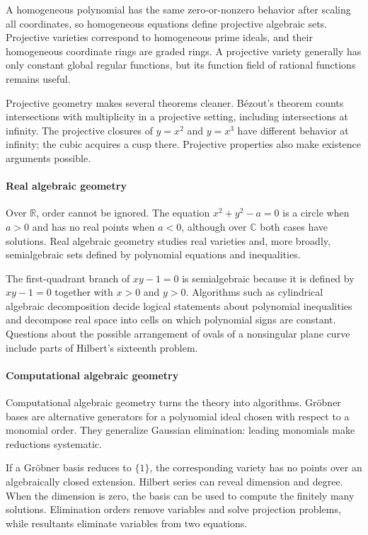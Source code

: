 A homogeneous polynomial has the same zero-or-nonzero behavior after scaling all coordinates, so homogeneous equations define projective algebraic sets. Projective varieties correspond to homogeneous prime ideals, and their homogeneous coordinate rings are graded rings. A projective variety generally has only constant global regular functions, but its function field of rational functions remains useful.

Projective geometry makes several theorems cleaner. Bézout's theorem counts intersections with multiplicity in a projective setting, including intersections at infinity. The projective closures of $y=x^2$ and $y=x^3$ have different behavior at infinity; the cubic acquires a cusp there. Projective properties also make existence arguments possible.

\paragraph{Real algebraic geometry}

Over $\mathbb R$, order cannot be ignored. The equation $x^2+y^2-a=0$ is a circle when $a>0$ and has no real points when $a<0$, although over $\mathbb C$ both cases have solutions. Real algebraic geometry studies real varieties and, more broadly, semialgebraic sets defined by polynomial equations and inequalities.

The first-quadrant branch of $xy-1=0$ is semialgebraic because it is defined by $xy-1=0$ together with $x>0$ and $y>0$. Algorithms such as cylindrical algebraic decomposition decide logical statements about polynomial inequalities and decompose real space into cells on which polynomial signs are constant. Questions about the possible arrangement of ovals of a nonsingular plane curve include parts of Hilbert's sixteenth problem.

\paragraph{Computational algebraic geometry}

Computational algebraic geometry turns the theory into algorithms. Gröbner bases are alternative generators for a polynomial ideal chosen with respect to a monomial order. They generalize Gaussian elimination: leading monomials make reductions systematic.

If a Gröbner basis reduces to $\{1\}$, the corresponding variety has no points over an algebraically closed extension. Hilbert series can reveal dimension and degree. When the dimension is zero, the basis can be used to compute the finitely many solutions. Elimination orders remove variables and solve projection problems, while resultants eliminate variables from two equations.

